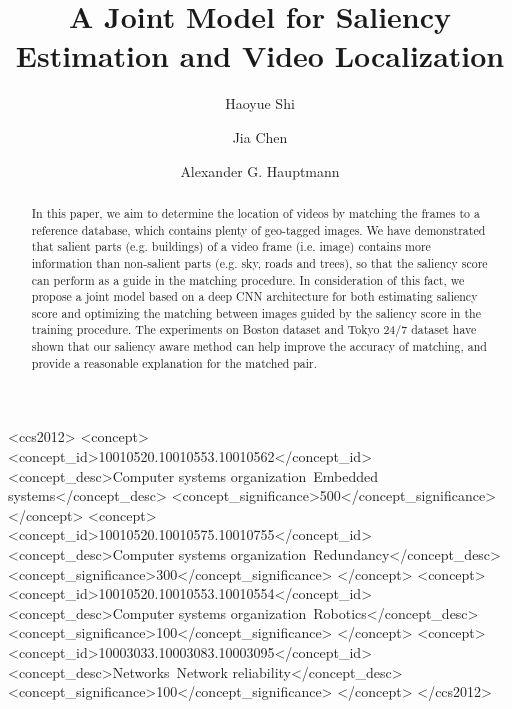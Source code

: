 \documentclass[sigconf, review=true, anonymous=true]{acmart}
\begin{document}
\title{A Joint Model for Saliency Estimation and Video Localization}

\author{Haoyue Shi}

\author{Jia Chen}

\author{Alexander G. Hauptmann}


\begin{abstract}
\par
In this paper, we aim to determine the location of videos by matching the frames to a reference database, which contains plenty of geo-tagged images. We have demonstrated that salient parts (e.g. buildings) of a video frame (i.e. image) contains more information than non-salient parts (e.g. sky, roads and trees), so that the saliency score can perform as a guide in the matching procedure. In consideration of this fact, we propose a joint model based on a deep CNN architecture for both estimating saliency score and optimizing the matching between images guided by the saliency score in the training procedure. The experiments on Boston dataset and Tokyo 24/7 dataset have shown that our saliency aware method can help improve the accuracy of matching, and provide a reasonable explanation for the matched pair. 
\end{abstract}

\begin{CCSXML}
<ccs2012>
 <concept>
  <concept_id>10010520.10010553.10010562</concept_id>
  <concept_desc>Computer systems organization~Embedded systems</concept_desc>
  <concept_significance>500</concept_significance>
 </concept>
 <concept>
  <concept_id>10010520.10010575.10010755</concept_id>
  <concept_desc>Computer systems organization~Redundancy</concept_desc>
  <concept_significance>300</concept_significance>
 </concept>
 <concept>
  <concept_id>10010520.10010553.10010554</concept_id>
  <concept_desc>Computer systems organization~Robotics</concept_desc>
  <concept_significance>100</concept_significance>
 </concept>
 <concept>
  <concept_id>10003033.10003083.10003095</concept_id>
  <concept_desc>Networks~Network reliability</concept_desc>
  <concept_significance>100</concept_significance>
 </concept>
</ccs2012>  
\end{CCSXML}
\end{document}
